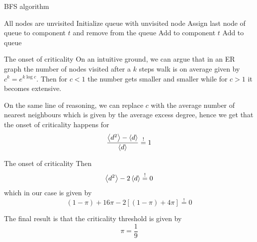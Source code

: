 \documentclass[handout]{beamer}
\newcommand{\reqeq}{\overset{!}{=}}
\begin{document}
\begin{frame}{BFS algorithm}
    \begin{algorithm}[H]
        \begin{algorithmic}[1]
            \STATE All nodes are unvisited
                \STATE Initialize queue with unvisited node
                    \STATE Assign last node of queue to component $t$
                    and remove from the queue
                            \STATE Add to component $t$
                            \STATE Add to queue
                        \ENDIF
                    \ENDFOR
                \ENDWHILE
            \ENDWHILE
        \end{algorithmic}
        \caption{Breadth-First Search algorithm implementation}
        \label{algo:bfs}
    \end{algorithm}
\end{frame}

\begin{frame}{The onset of criticality}
    On an intuitive ground, we can argue that in an ER graph the number of nodes
    visited after a $k$ steps walk is on average given by $c^k=e^{k\log{c}}$.
    Then for $c<1$ the number gets smaller and smaller while for $c>1$ it
    becomes extensive.

    On the same line of reasoning, we can replace $c$ with the average number of
    nearest neighbours which is given by the average excess degree, hence we get
    that the onset of criticality happens for
    \begin{equation}
        \frac{\expval{d^2} - \expval{d}}{\expval{d}} \reqeq 1
        \label{eq:onset_condition}
    \end{equation}
\end{frame}

\begin{frame}{The onset of criticality}
    Then
    $$
    \expval{d^2} - 2\expval{d} \reqeq 0
    $$
    which in our case is given by
    $$
    (1-\pi) + 16 \pi - 2 [(1-\pi) + 4 \pi] \reqeq 0
    $$

    The final result is that the criticality threshold is given by
    \begin{equation}
        \pi = \frac{1}{9}
    \end{equation}
\end{frame}
\end{document}
